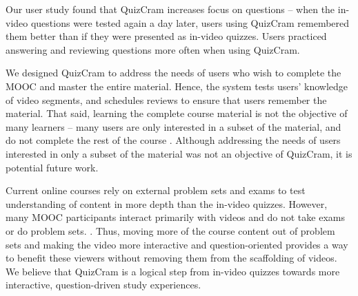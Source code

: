 \documentclass{sigchi}
\begin{document}

Our user study found that QuizCram increases focus on questions -- when the in-video questions were tested again a day later, users using QuizCram remembered them better than if they were presented as in-video quizzes. Users practiced answering and reviewing questions more often when using QuizCram. %

We designed QuizCram to address the needs of users who wish to complete the MOOC and master the entire material. Hence, the system tests users' knowledge of video segments, and schedules reviews to ensure that users remember the material. That said, learning the complete course material is not the objective of many learners  -- many users are only interested in a subset of the material, and do not complete the rest of the course \cite{deconstructing} \cite{anderson2014engaging}. Although addressing the needs of users interested in only a subset of the material was not an objective of QuizCram, it is potential future work. %

Current online courses rely on external problem sets and exams to test understanding of content in more depth than the in-video quizzes. However, many MOOC participants interact primarily with videos and do not take exams or do problem sets. \cite{anderson2014engaging} \cite{deconstructing}. Thus, moving more of the course content out of problem sets and making the video more interactive and question-oriented provides a way to benefit these viewers without removing them from the scaffolding of videos. We believe that QuizCram is a logical step from in-video quizzes towards more interactive, question-driven study experiences.
\end{document}
